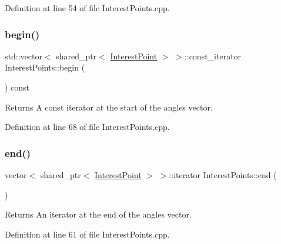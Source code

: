 Definition at line 54 of file Interest\+Points.\+cpp.

\mbox{\label{classdefals_1_1_interest_points_afd91f2dce0f1dd0da27da44e74fb3bac}} 
\subsubsection{\texorpdfstring{begin()}{begin()}\hspace{0.1cm}{\footnotesize\ttfamily [2/2]}}
{\footnotesize\ttfamily std\+::vector$<$ shared\+\_\+ptr$<$ \hyperlink{classdefals_1_1_interest_point}{Interest\+Point} $>$ $>$\+::const\+\_\+iterator Interest\+Points\+::begin (\begin{DoxyParamCaption}{ }\end{DoxyParamCaption}) const}

\begin{DoxyReturn}{Returns}
A const iterator at the start of the angles vector. 
\end{DoxyReturn}


Definition at line 68 of file Interest\+Points.\+cpp.

\mbox{\label{classdefals_1_1_interest_points_a2eb0a72c63bfa30f454a2c90c029f369}} 
\subsubsection{\texorpdfstring{end()}{end()}\hspace{0.1cm}{\footnotesize\ttfamily [1/2]}}
{\footnotesize\ttfamily vector$<$ shared\+\_\+ptr$<$ \hyperlink{classdefals_1_1_interest_point}{Interest\+Point} $>$ $>$\+::iterator Interest\+Points\+::end (\begin{DoxyParamCaption}{ }\end{DoxyParamCaption})}

\begin{DoxyReturn}{Returns}
An iterator at the end of the angles vector. 
\end{DoxyReturn}


Definition at line 61 of file Interest\+Points.\+cpp.

